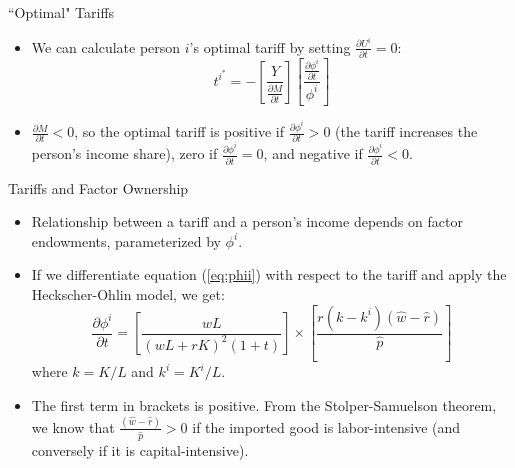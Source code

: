\documentclass[aspectratio=169]{beamer}
\begin{document}
\begin{frame}{``Optimal" Tariffs}

\begin{itemize}
    \item<1-> We can calculate person $ i $’s optimal tariff by setting $ \frac{\partial U^{i}}{\partial t} = 0 $:
    \begin{equation}
        t^{i^{*}} = - \left[ \frac{Y}{\frac{\partial M}{\partial t}} \right] \left[ \frac{\frac{\partial \phi^{i}}{\partial t}}{\phi^{i}} \right]
        \label{eq:optimalti}
    \end{equation}
    \item<2-> $ \frac{\partial M}{\partial t} < 0 $, so the optimal tariff is positive if $ \frac{\partial \phi^{i}}{\partial t} > 0 $ (the tariff increases the person's income share), zero if $ \frac{\partial \phi^{i}}{\partial t} = 0 $, and negative if $ \frac{\partial \phi^{i}}{\partial t} < 0 $.
\end{itemize}
    
\end{frame}


\begin{frame}{Tariffs and Factor Ownership}

\begin{itemize}
    \item<1-> Relationship between a tariff and a person’s income depends on factor endowments, parameterized by $ \phi^{i} $.
    \item<2-> If we differentiate equation (\ref{eq:phii}) with respect to the tariff and apply the Heckscher-Ohlin model, we get:
    \begin{equation}
        \frac{\partial \phi^{i}}{\partial t} = \left[ \frac{wL}{\left( wL + rK \right)^{2} \left( 1 + t \right)} \right] \times \left[ \frac{r\left( k - k^{i} \right) \left( \hat{w} - \hat{r} \right)}{\hat{p}} \right]
        \label{eq:dphidt}
    \end{equation}
    where $ k = K / L $ and $ k^{i} = K^{i} / L $.
    \item<3-> The first term in brackets is positive.  From the Stolper-Samuelson theorem, we know that $ \frac{\left( \hat{w} - \hat{r} \right)}{\hat{p}} > 0 $ if the imported good is labor-intensive (and conversely if it is capital-intensive).
\end{itemize}
    
\end{frame}
\end{document}

